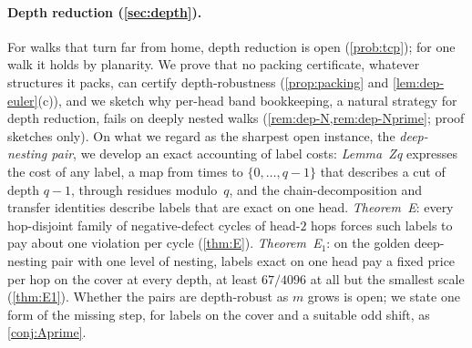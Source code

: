\paragraph{Depth reduction (\cref{sec:depth}).} For walks that turn far from home, depth reduction is open (\cref{prob:tcp});
for one walk it holds by planarity. We prove that no packing certificate, whatever structures it packs, can
certify depth-robustness
(\cref{prop:packing} and \cref{lem:dep-euler}(c)), and we sketch why per-head band bookkeeping, a natural strategy for depth reduction, fails on
deeply nested walks (\cref{rem:dep-N,rem:dep-Nprime}; proof sketches only). On what we regard as the sharpest open instance, the \emph{deep-nesting pair}, we develop an exact accounting of label
costs: \emph{Lemma~Zq} expresses the cost of any label, a map from times to $\{0,\dots,q-1\}$ that describes a cut of depth
$q-1$, through residues modulo~$q$, and the
chain-decomposition and transfer identities describe labels that are exact on one head. \emph{Theorem~E}: every
hop-disjoint family of negative-defect cycles of head-$2$ hops forces such labels to pay about one violation per cycle
(\cref{thm:E}). \emph{Theorem~E$_1$}: on the golden deep-nesting pair with one level of nesting, labels exact on one head pay a fixed
price per hop on the cover at every depth, at least $67/4096$ at all but the smallest scale (\cref{thm:E1}). Whether the pairs are depth-robust as $m$ grows is open; we state one form of the
missing step, for labels on the cover and a suitable odd shift, as \cref{conj:Aprime}.

